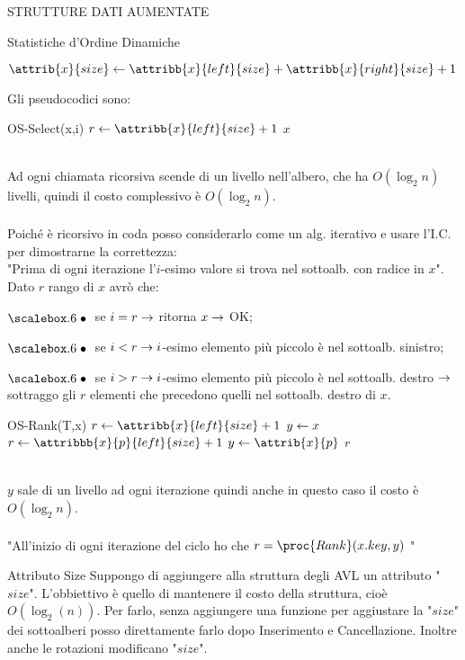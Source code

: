 \documentclass[8pt]{extarticle}
\begin{document}
\begin{formulario}
\begin{myParagraph}{STRUTTURE DATI AUMENTATE}
\begin{subParagraph}{Statistiche d'Ordine Dinamiche}
			\begin{tcenter}
			$\attrib{x}{size}\get\attribb{x}{left}{size}+\attribb{x}{right}{size}+1$
			\end{tcenter}
Gli pseudocodici sono:
			\begin{code}{OS-Select(x,i)}
\li $r\get \attribb{x}{left}{size} +1$ 
\li {}
	\li \RETURN $x$
\li {}
	\li \RETURN {}
\li \ELSE
\li \RETURN {}
\END
			\end{code}	
\\
Ad ogni chiamata ricorsiva scende di un livello nell'albero, che ha $O(\log_2 n)$ livelli, quindi il costo complessivo è $O(\log_2 n)$.\\
\\
Poiché è ricorsivo in coda posso considerarlo come un alg. iterativo e usare l'I.C. per dimostrarne la correttezza:\\
"Prima di ogni iterazione l'$i$-esimo valore si trova nel sottoalb. con radice in $x$".\\
Dato $r$ rango di $x$ avrò che:
			\begin{descr}{1}
				\item[$\scalare$] se $i=r \rightarrow$ ritorna $x\rightarrow$ OK;
				\item[$\scalare$] se $i<r \rightarrow i$-esimo elemento più piccolo è nel sottoalb. sinistro;  
				\item[$\scalare$] se $i>r \rightarrow i$-esimo elemento più piccolo è nel sottoalb. destro $\rightarrow$ sottraggo gli $r$ elementi che precedono quelli nel sottoalb. destro di $x$.
			\end{descr}
			\begin{code}{OS-Rank(T,x)}
\li $r\get\attribb{x}{left}{size}+1$
\li $y\leftarrow x$
\li {}
	\li {}
		\li $r\get\attribbb{x}{p}{left}{size}+1$
	\END
	\li $y\get\attrib{x}{p}$
\END
\li \RETURN $r$
			\end{code}
\\
$y$ sale di un livello ad ogni iterazione quindi anche in questo caso il costo è $O(\log_2 n)$.\\
\\
"All'inizio di ogni iterazione del ciclo ho che $r=\proc{Rank}(x.key,y)$ "
		\end{subParagraph}
		\begin{subParagraph}{Attributo Size}
Suppongo di aggiungere alla struttura degli AVL un attributo "$size$". L'obbiettivo è quello di mantenere il costo della struttura, cioè $O(\log_2(n))$. Per farlo, senza aggiungere una funzione per aggiustare la "$size$" dei sottoalberi posso direttamente farlo dopo Inserimento e Cancellazione. Inoltre anche le rotazioni modificano "$size$".

\end{subParagraph}
\end{myParagraph}
\end{formulario}
\end{document}
